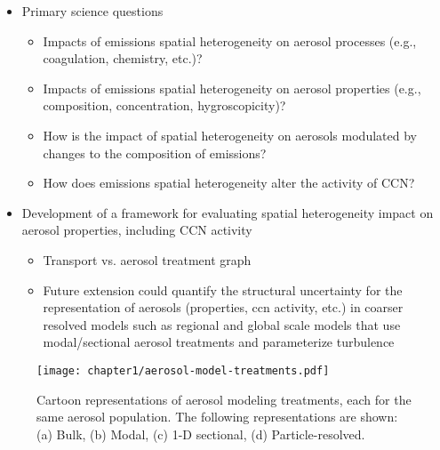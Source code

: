 \begin{itemize}

\item Primary science questions
\begin{itemize}
\item Impacts of emissions spatial heterogeneity on aerosol processes (e.g., coagulation, chemistry, etc.)?
\item Impacts of emissions spatial heterogeneity on aerosol properties (e.g., composition, concentration, hygroscopicity)? 
\item How is the impact of spatial heterogeneity on aerosols modulated by changes to the composition of emissions?
\item How does emissions spatial heterogeneity alter the activity of CCN?
\end{itemize}

\item Development of a framework for evaluating spatial heterogeneity impact on aerosol properties, including CCN activity
\begin{itemize}
\item Transport vs. aerosol treatment graph 
\item Future extension could quantify the structural uncertainty for the representation of aerosols (properties, ccn activity, etc.) in coarser resolved models such as regional and global scale models that use modal/sectional aerosol treatments and parameterize turbulence 
\end{itemize}

\end{itemize}

\begin{figure}[!t]
	\centering
	\texttt{[image: chapter1/aerosol-model-treatments.pdf]}
	\caption{Cartoon representations of aerosol modeling treatments, each for the same aerosol population. The following representations are shown: (a) Bulk, (b) Modal, (c) 1-D sectional, (d) Particle-resolved.}
	\label{fig:test}
\end{figure}
